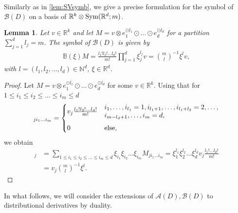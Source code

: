 \documentclass[a4paper, 10pt, twoside, notitlepage]{amsart}
\theoremstyle{plain}
\newtheorem{lem}[prop]{Lemma}
\newcommand{\R}{\mathbb{R}}
\newcommand{\A}{\mathcal{A}}
\renewcommand{\S}[1]{\textup{Sym}(\R^d;#1)}
\begin{document}
            
            Similarly as in \cref{lem:SVsymb}, we give a precise formulation for the symbol of $\mathcal{B}(D)$ on a basis of $\R^k \otimes \S{m}$.
            \begin{lem} \label{lem:SymbolDiv}
              Let $v\in\R^k$ and let $M = v \otimes e_1^{\odot l_1} \odot \dots \odot e_d^{\odot l_d}$ for a partition $\sum_{j=1}^d l_j = m$. The symbol of $\mathcal{B}(D)$ is given by
              \begin{align*}
                \mathbb{B}(\xi)M = \frac{l_1! l_2! \dots l_d!}{m!} \prod_{j=1}^d \xi_j^{l_j} v = \binom{m}{l}^{-1} \xi^l v,
              \end{align*}
              with $l = (l_1,l_2,\dots,l_d) \in \mathbb{N}^d$, $\xi \in \R^d$.
            \end{lem}
            \begin{proof}
              Let $M = v \otimes e_1^{\odot l_1} \odot \dots \odot e_d^{\odot l_d}$ for some $v \in \R^k$. Using that for $1 \leq i_1 \leq i_2 \leq \dots \leq i_m \leq d$
              \begin{align*}
                [M]_{j i_1 \dots i_m} = \begin{cases}
                                          v_j \frac{l_1! l_2! \dots l_{d}!}{m!} & \begin{aligned} &i_1,\dots,i_{l_1} = 1, i_{l_1+1}, \dots, i_{l_1+l_2} = 2, \dots, \\ &i_{m-l_d+1}, \dots, i_{m} = d, \end{aligned} \vspace{5pt}\\
                                          0 & \text{else,}
                                        \end{cases}
              \end{align*}
              we obtain
                        \begin{align*}
                          [\mathbb{B}(\xi)M]_j & = \sum_{1 \leq i_1 \leq i_2 \leq \dots \leq i_m \leq d} \xi_{i_1} \xi_{i_2} \dots \xi_{i_m} M_{ji_1 \dots i_m} = \xi_1^{l_1} \xi_{2}^{l_2} \dots \xi_{d}^{l_d} v_j \frac{l_1! \dots l_d!}{m!}\\
                          & = v_j \binom{m}{l}^{-1} \xi^l.
                          \end{align*}
            \end{proof}
          

          In what follows, we will consider the extensions of $\A(D), \mathcal{B}(D)$ to distributional derivatives by duality.
          
\end{document}

